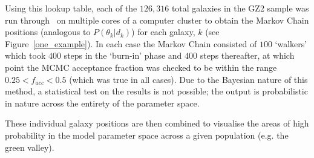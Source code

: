 Using this lookup table, each of the $126,316$ total galaxies in the GZ2 sample was run through \starpy ~on multiple cores of a computer cluster to obtain the Markov Chain positions (analogous to $P(\theta_k|d_k)$) for each galaxy, $k$ (see Figure~\ref{one_example}). In each case the Markov Chain consisted of $100$ `walkers' which took $400$ steps in the `burn-in' phase and $400$ steps thereafter, at which point the MCMC acceptance fraction was checked to be within the range $0.25 < f_{acc} < 0.5$ (which was true in all cases). Due to the Bayesian nature of this method, a statistical test on the results is not possible; the output is probabilistic in nature across the entirety of the parameter space.

These individual galaxy positions are then combined to visualise the areas of high probability in the model parameter space across a given population (e.g. the green valley). 

\begin{table}
\label{discardnum}
\end{table}

